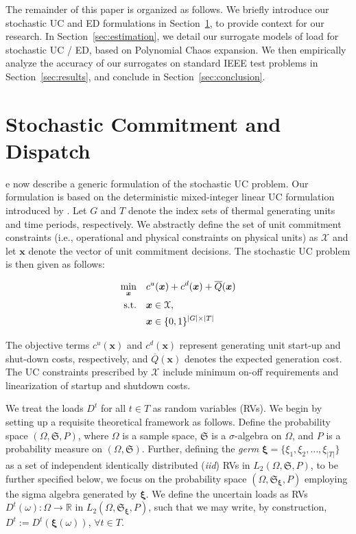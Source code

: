 \documentclass[conference]{IEEEtran}
\newcommand{\Sfr}{\mathfrak{S}}
\newcommand{\xivec}{{\boldsymbol{\xi}}}
\begin{document}
The remainder of this paper is organized as follows. We briefly
introduce our stochastic UC and ED formulations in Section~\ref{sec:suc}, to
provide context for our research. In Section~\ref{sec:estimation}, we
detail our surrogate models of load for stochastic UC / ED, based on 
Polynomial Chaos expansion. We then empirically analyze the accuracy
of our surrogates on standard IEEE test problems in 
Section~\ref{sec:results}, and conclude in Section~\ref{sec:conclusion}.
 

\section{Stochastic Commitment and Dispatch}
\label{sec:suc}

e now describe a generic formulation of the stochastic UC problem. 
Our formulation is based on the deterministic mixed-integer linear 
UC formulation introduced by \cite{carrionarroyo06}.  Let $G$ and $T$ 
denote the index sets of thermal generating units and time periods, 
respectively. We abstractly define the set of unit commitment constraints 
(i.e., operational and physical constraints on physical units) as $\mathcal
X$ and let $\boldsymbol x$ denote the vector of unit commitment decisions. 
The stochastic UC problem is then given as follows:

\begin{subequations}\label{2_stage}
\begin{align}
\min_{\boldsymbol {x} } \quad  &c^u(\boldsymbol x) +
c^d(\boldsymbol x) + \overline Q(\boldsymbol x) \\
\textmd{s.t.} \quad & \boldsymbol x \in \mathcal X,\\
& \boldsymbol x \in \{0,1\}^{|G|\times |T|}
\end{align}
\end{subequations}

The objective terms $c^u(\boldsymbol x)$ and $c^d(\boldsymbol x)$
represent generating unit start-up and shut-down costs, respectively, 
and $\overline Q(\boldsymbol x)$ denotes the expected generation
cost.  The UC constraints prescribed by $\mathcal X$ include minimum on-off requirements and
linearization of startup and shutdown costs.


We treat the loads $D^t$ for all $t \in T$ as random variables (RVs).
We begin by setting up a requisite theoretical framework as follows.
Define the probability space $(\Omega, \Sfr, P)$, where $\Omega$ is a sample
space, $\Sfr$ is a $\sigma$-algebra on $\Omega$, and $P$ is a probability
measure on $(\Omega,\Sfr)$. Further, defining the \emph{germ}
$\xivec=\{\xi_1,\xi_2,\ldots,\xi_{|T|}\}$ as a set of independent identically distributed
(\emph{iid}) RVs in $L_2(\Omega,\Sfr,P)$, to be further specified
below, we focus on the probability space $(\Omega,\Sfr_\xivec,P)$ employing the
sigma algebra generated by $\xivec$. We define the uncertain loads as RVs
$D^t(\omega):\Omega\rightarrow\mathbb{R}$ in
$L_2(\Omega,\Sfr_\xivec,P)$, such that we may write, by construction, 
$D^t:=D^t(\xivec(\omega))$, $\forall t\in T$.
\end{document}

